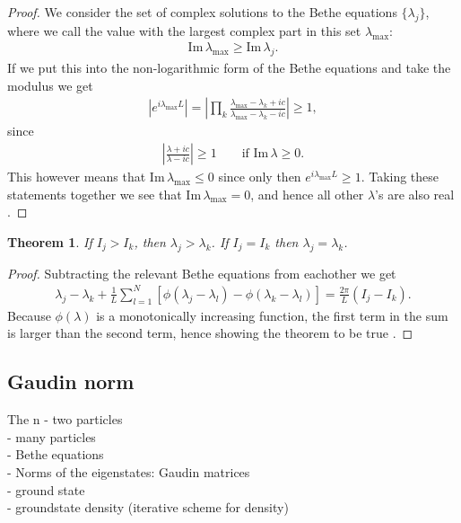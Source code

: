 \documentclass[11pt, a4paper,draft]{report} %
\newtheorem{theorem}{Theorem}
\begin{document}
\begin{proof}
We consider the set of complex solutions to the Bethe equations \(\{\lambda_j\}\), where we call the value with the largest complex part in this set \(\lambda_{\textrm{max}}\):
\begin{align}
\textrm{Im} \, \lambda_{\textrm{max}} \geq \textrm{Im} \, \lambda_j.
\end{align}
If we put this into the non-logarithmic form of the Bethe equations and take the modulus we get
\begin{align}
  \left| e^{i\lambda_{\textrm{max}} L} \right|= \left| \prod_k \frac{\lambda_{\textrm{max}} - \lambda_k + ic}{\lambda_{\textrm{max}} - \lambda_k - ic} \right|\geq 1,
\end{align}
since
\begin{align}
\left|\frac{\lambda+ic}{\lambda-ic} \right| \geq 1 \qquad \textrm{if Im}\, \lambda \geq 0.
\end{align}
This however means that \(\textrm{Im}\, \lambda_{\textrm{max}} \leq 0\) since only then \(e^{i\lambda_{\textrm{max}}L} \geq 1\).
Taking these statements together we see that \(\textrm{Im}\, \lambda_{\textrm{max}}=0\), and hence all other \(\lambda\)'s are also real \cite{Korepin1993}.
\end{proof}

\begin{theorem}
If \(I_j >I_k\), then \(\lambda_j > \lambda_k\). If \(I_j=I_k\) then \(\lambda_j=\lambda_k\).
\end{theorem}

\begin{proof}
Subtracting the relevant Bethe equations from eachother we get
\begin{align}
  \lambda_j - \lambda_k + \frac{1}{L}\sum_{l=1}^N \left[\phi(\lambda_j - \lambda_l) - \phi(\lambda_k - \lambda_l)\right] = \frac{2\pi}{L} (I_j - I_k).
\end{align}
Because \(\phi(\lambda)\) is a monotonically increasing function, the first term in the sum is larger than the second term, hence showing the theorem to be true \cite{Korepin1993}.
\end{proof}

\subsection{Gaudin norm}
The n
- two particles \\
- many particles\\
- Bethe equations\\
- Norms of the eigenstates: Gaudin matrices\\
- ground state\\
- groundstate density (iterative scheme for density)\cite{Zemyan2012}
\end{document}
